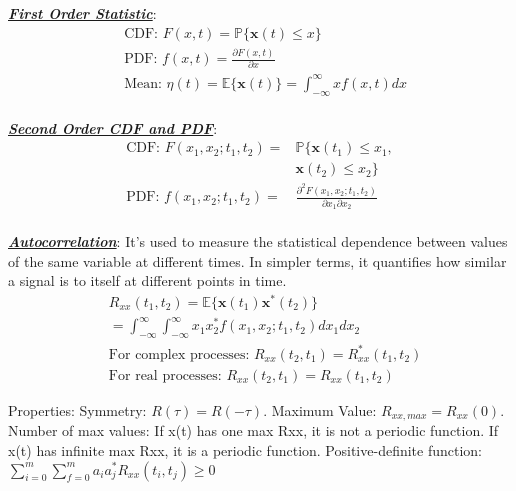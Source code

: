 \documentclass[12pt]{article}
\newcommand{\bulletPoint}[1]{\ul{\textit{\textbf{#1}}}}
\begin{document}
\begin{multicols*}{4}
\bulletPoint{First Order Statistic}:
\useshortskip \begin{equation*}
    \begin{split}
        & \text{CDF: } F(x,t) = \mathbb{P}\{ \mathbf{x}(t) \leq x \}\\
        & \text{PDF: } f(x,t) = \frac{\partial F(x,t)}{\partial x}\\
        & \text{Mean: } \eta (t) = \mathbb{E}\{ \mathbf{x}(t) \} = \int^{\infty}_{-\infty}xf(x,t)dx\\
    \end{split}
\end{equation*}


\bulletPoint{Second Order CDF and PDF}:
\useshortskip \begin{equation*}
    \begin{split}
        \text{CDF: } F(x_1, x_2; t_1, t_2) = & \mathbb{P}\{ \mathbf{x}(t_1) \leq x_1, \\
        & \mathbf{x}(t_2) \leq x_2 \}\\
        \text{PDF: } f(x_1, x_2; t_1, t_2) = & \frac{\partial^2 F(x_1, x_2; t_1, t_2)}{\partial x_1 \partial x_2}\\
    \end{split}
\end{equation*}


\bulletPoint{Autocorrelation}:
It's used to measure the statistical dependence between values of the same variable at different times. In simpler terms, it quantifies how similar a signal is to itself at different points in time.
\useshortskip \begin{equation*}
    \begin{split}
         & R_{xx}(t_1, t_2)= \mathbb{E}\{ \mathbf{x}(t_1) \mathbf{x}^*(t_2) \} \\[-3pt]
         & = \int^{\infty}_{-\infty}\int^{\infty}_{-\infty}x_1 x^*_2 f(x_1, x_2; t_1, t_2)dx_1dx_2\\[-3pt]
         & \text{For complex processes: }R_{xx}(t_2,t_1) = R^*_{xx}(t_1,t_2) \\[-3pt]
         & \text{For real processes: }R_{xx}(t_2,t_1) = R_{xx}(t_1,t_2)
    \end{split}
\end{equation*}

Properties: Symmetry: $R(\tau) = R(-\tau)$. Maximum Value: $R_{xx, max}=R_{xx}(0)$. Number of max values: If x(t) has one max Rxx, it is not a periodic function. If x(t) has infinite max Rxx, it is a periodic function. Positive-definite function: $\sum^m_{i=0}\sum^m_{f=0}a_ia^*_jR_{xx}(t_i,t_j)\geq 0$


\end{multicols*}
\end{document}
